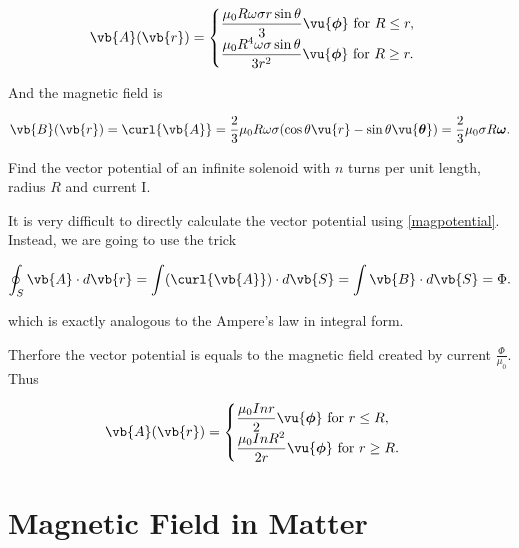 \documentclass[english,a4paper,12pt]{report}
\begin{document}
{\begin{equation}
    \vb{A} (\vb{r} ) = \begin{cases}
        \displaystyle \frac{\mu_0 R\omega \sigma r\sin \theta }{3} \vu{\boldsymbol{\phi } } \text{ for } R \le  r,\\
        \displaystyle \frac{\mu_0 R^4 \omega \sigma \sin \theta }{3r^2} \vu{\boldsymbol{\phi } } \text{ for } R \ge r.
    \end{cases}
\end{equation}

And the magnetic field is 

\begin{equation}
    \vb{B} (\vb{r} ) = \curl{\vb{A} } = \frac{2}{3} \mu_0 R \omega \sigma (\cos \theta \vu{r} - \sin \theta \vu{\boldsymbol{\theta } }) = \frac{2}{3} \mu_0 \sigma R \boldsymbol{\omega } .   
\end{equation}
}

{Find the vector potential of an infinite solenoid with \(n\) turns per unit length, radius \(R\) and current I.}
{It is very difficult to directly calculate the vector potential using \cref{magpotential}. Instead, we are going to use the trick

\begin{equation}
    \oint_{S} \vb{A} \cdot d\vb{r} = \int (\curl{\vb{A} } ) \cdot d\vb{S} = \int \vb{B} \cdot d\vb{S} = \Phi .
\end{equation}

which is exactly analogous to the Ampere's law in integral form.

Therfore the vector potential is equals to the magnetic field created by current \(\displaystyle \frac{\Phi }{\mu_0 } \). Thus

\begin{equation}
    \vb{A} (\vb{r} ) = \begin{cases}
        \displaystyle \frac{\mu_0 Inr}{2}\vu{\boldsymbol{\phi } }  \text{ for } r \le R,\\
        \displaystyle \frac{\mu_0 InR^2}{2r}\vu{\boldsymbol{\phi } }  \text{ for } r \ge R.
    \end{cases}
\end{equation}


}

\chapter{Magnetic Field in Matter}
\end{document}

